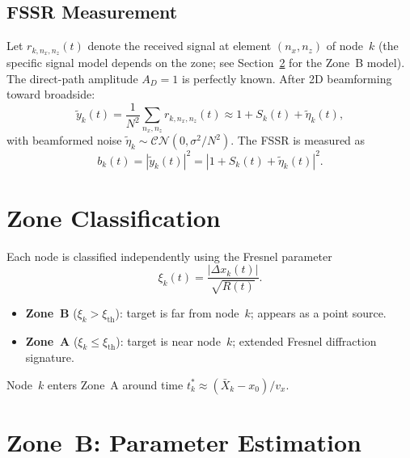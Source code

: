\documentclass[11pt,a4paper]{article}
\begin{document}
\subsection{FSSR Measurement}

Let $r_{k,n_x,n_z}(t)$ denote the received signal at element
$(n_x,n_z)$ of node~$k$ (the specific signal model depends on the
zone; see Section~\ref{sec:zone_b} for the Zone~B model).
The direct-path amplitude $A_D=1$ is perfectly known.  After 2D
beamforming toward broadside:
\begin{equation}
  \tilde{y}_k(t) = \frac{1}{N^2}\sum_{n_x,n_z}r_{k,n_x,n_z}(t)
  \approx 1+S_k(t)+\tilde{\eta}_k(t),
  \label{eq:beamformed}
\end{equation}
with beamformed noise
$\tilde{\eta}_k\sim\mathcal{CN}(0,\sigma^2/N^2)$.  The FSSR is
measured as
\begin{equation}
  b_k(t)=|\tilde{y}_k(t)|^2
  =|1+S_k(t)+\tilde{\eta}_k(t)|^2.
  \label{eq:bk}
\end{equation}

\section{Zone Classification}
\label{sec:zones}

Each node is classified independently using the Fresnel parameter
\begin{equation}
  \xi_k(t)=\frac{|\Delta x_k(t)|}{\sqrt{R(t)}}.
  \label{eq:xi}
\end{equation}
\begin{itemize}
  \item \textbf{Zone~B} ($\xi_k>\xi_{\mathrm{th}}$): target is far
    from node~$k$; appears as a point source.
  \item \textbf{Zone~A} ($\xi_k\le\xi_{\mathrm{th}}$): target is
    near node~$k$; extended Fresnel diffraction signature.
\end{itemize}
Node~$k$ enters Zone~A around time
$t_k^*\approx(\bar{X}_k-x_0)/v_x$.

\section{Zone~B: Parameter Estimation}
\label{sec:zone_b}
\end{document}
